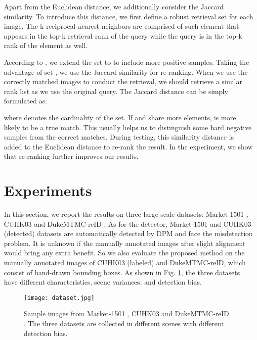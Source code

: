 Apart from the Euclidean distance, we additionally consider the Jaccard similarity. To introduce this distance, we first define a robust retrieval set for each image. The k-reciprocal nearest neighbors  are comprised of such element that appears in the top-k retrieval rank of the query  while the query is in the top-k rank of the element as well. 

According to \cite{zhong2017re}, we extend the set  to  to include more positive samples. Taking the advantage of set , we use the Jaccard similarity for re-ranking. When we use the correctly matched images to conduct the retrieval, we should retrieve a similar rank list as we use the original query. The Jaccard distance can be simply formulated as:

where  denotes the cardinality of the set. If  and  share more elements,  is more likely to be a true match. This usually helps us to distinguish some hard negative samples from the correct matches. During testing, this similarity distance is added to the Euclidean distance to re-rank the result. In the experiment, we show that re-ranking further improves our results.

\section{Experiments} \label{experiments}
In this section, we report the results on three large-scale datasets: Market-1501 \cite{zheng2015scalable}, CUHK03 \cite{li2014deepreid} and DukeMTMC-reID \cite{zheng2017unlabeled}. As for the detector, Market-1501 and CUHK03 (detected) datasets are automatically detected by DPM and face the misdetection problem. It is unknown if the manually annotated images after slight alignment would bring any extra benefit. So we also evaluate the proposed method on the manually annotated images of CUHK03 (labeled) and DukeMTMC-reID, which consist of hand-drawn bounding boxes. As shown in Fig. \ref{fig:dataset}, the three datasets have different characteristics, \ie scene variances, and detection bias.

\begin{figure}[t]
\begin{center}
\texttt{[image: dataset.jpg]}
\end{center}
   \caption{Sample images from Market-1501 \cite{zheng2015scalable}, CUHK03 \cite{li2014deepreid} and DukeMTMC-reID \cite{zheng2017unlabeled}. The three datasets are collected in different scenes with different detection bias.}
\label{fig:dataset}
\end{figure}

